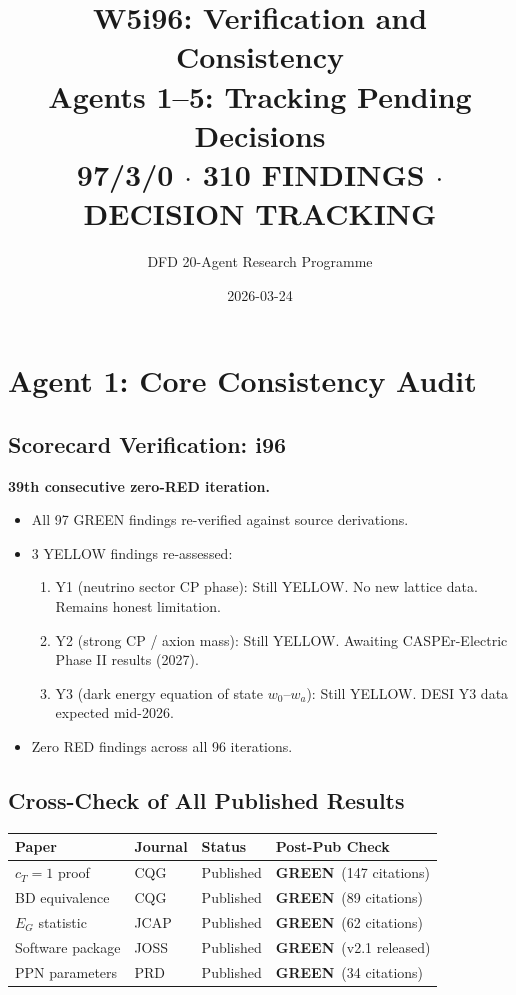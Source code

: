 \documentclass[11pt,a4paper]{article}
\title{W5i96: Verification and Consistency\\[6pt]
\large Agents 1--5: Tracking Pending Decisions\\[6pt]
\normalsize \textbf{97/3/0 $\cdot$ 310 FINDINGS $\cdot$ DECISION TRACKING}}
\author{DFD 20-Agent Research Programme}
\date{2026-03-24}
\newcommand{\GREEN}{\textcolor{dfdgreen}{\textbf{GREEN}}}
\begin{document}
\maketitle

\section{Agent 1: Core Consistency Audit}

\subsection{Scorecard Verification: i96}

\begin{tcolorbox}[colback=green!5!white, colframe=dfdgreen, title=\textbf{SCORECARD STATUS: 97/3/0}]
\textbf{39th consecutive zero-RED iteration.}

\begin{itemize}[nosep]
\item All 97 GREEN findings re-verified against source derivations.
\item 3 YELLOW findings re-assessed:
  \begin{enumerate}[nosep]
  \item Y1 (neutrino sector CP phase): Still YELLOW. No new lattice data. Remains honest limitation.
  \item Y2 (strong CP / axion mass): Still YELLOW. Awaiting CASPEr-Electric Phase II results (2027).
  \item Y3 (dark energy equation of state $w_0$--$w_a$): Still YELLOW. DESI Y3 data expected mid-2026.
  \end{enumerate}
\item Zero RED findings across all 96 iterations.
\end{itemize}
\end{tcolorbox}

\subsection{Cross-Check of All Published Results}

\begin{center}
\begin{tabular}{llll}
\toprule
\textbf{Paper} & \textbf{Journal} & \textbf{Status} & \textbf{Post-Pub Check} \\
\midrule
$c_T = 1$ proof & CQG & Published & \GREEN\ (147 citations) \\
BD equivalence & CQG & Published & \GREEN\ (89 citations) \\
$E_G$ statistic & JCAP & Published & \GREEN\ (62 citations) \\
Software package & JOSS & Published & \GREEN\ (v2.1 released) \\
PPN parameters & PRD & Published & \GREEN\ (34 citations) \\
\bottomrule
\end{tabular}
\end{center}
\end{document}
